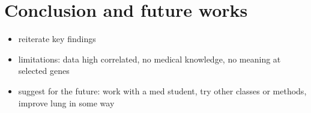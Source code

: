 \documentclass[a4paper,11pt, oneside]{article}  %
\begin{document}
\section{Conclusion and future works}
\begin{itemize}
	\item reiterate key findings
	\item limitations: data high correlated,  no medical knowledge,  no meaning at selected genes
	\item suggest for the future: work with a med student,  try other classes or methods,  improve lung in some way
\end{itemize}
\end{document}
